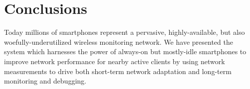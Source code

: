 \section{Conclusions}
\label{sec-conclusions}

Today millions of smartphones represent a pervasive, highly-available, but
also woefully-underutilized wireless monitoring network. We have presented
the \PS{} system which harnesses the power of always-on but mostly-idle
smartphones to improve network performance for nearby active clients by using
network measurements to drive both short-term network adaptation and
long-term monitoring and debugging.
